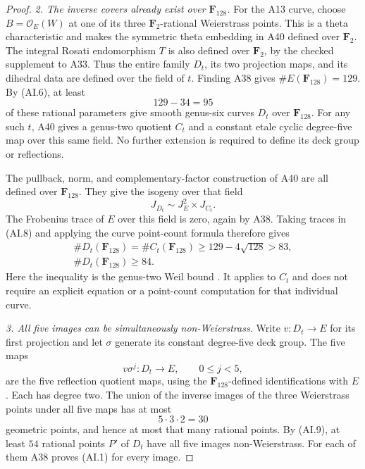 \documentclass[11pt,a4paper]{article}
\begin{document}
\begin{proof}
\emph{2. The inverse covers already exist over $\mathbf F_{128}$.}
For the A13 curve, choose $B=\mathcal O_E(W)$ at one of
its three $\mathbf F_2$-rational Weierstrass points. This
is a theta characteristic and makes the symmetric theta
embedding in A40 defined over $\mathbf F_2$.
The integral Rosati endomorphism $T$ is also defined over
$\mathbf F_2$, by the checked supplement to A33.
Thus the entire family $D_t$, its two projection maps,
and its dihedral data are defined over the field of $t$.
Finding A38 gives $\#E(\mathbf F_{128})=129$.
By (AI.6), at least
\[
                              129-34=95
 \tag{AI.7}
\]
of these rational parameters give smooth genus-six curves
$D_t$ over $\mathbf F_{128}$. For any such $t$, A40 gives
a genus-two quotient $C_t$ and a constant etale cyclic
degree-five map over this same field. No further extension
is required to define its deck group or reflections.

The pullback, norm, and complementary-factor construction
of A40 are all defined over $\mathbf F_{128}$. They give
the isogeny over that field
\[
                      J_{D_t}\sim J_E^2\times J_{C_t}.
 \tag{AI.8}
\]
The Frobenius trace of $E$ over this field is zero, again
by A38. Taking traces in (AI.8) and applying the curve
point-count formula therefore gives
\[
 \begin{gathered}
 \#D_t(\mathbf F_{128})=\#C_t(\mathbf F_{128})
       \ge129-4\sqrt{128}>83,\\
                    \#D_t(\mathbf F_{128})\ge84.
 \end{gathered}
 \tag{AI.9}
\]
Here the inequality is the genus-two Weil bound
\cite[Theorem~11.1]{MilneJV}. It applies to $C_t$ and
does not require an explicit equation or a point-count
computation for that individual curve.

\emph{3. All five images can be simultaneously non-Weierstrass.}
Write $v:D_t\to E$ for its first projection and let
$\sigma$ generate its constant degree-five deck group.
The five maps
\[
                         v\sigma^j:D_t\longrightarrow E,
                              \qquad 0\le j<5,
 \tag{AI.10}
\]
are the five reflection quotient maps, using the
$\mathbf F_{128}$-defined identifications with $E$.
Each has degree two. The union of the inverse images of
the three Weierstrass points under all five maps has at
most
\[
                               5\cdot3\cdot2=30
 \tag{AI.11}
\]
geometric points, and hence at most that many rational
points. By (AI.9), at least $54$ rational points $P'$ of
$D_t$ have all five images non-Weierstrass. For each of
them A38 proves (AI.1) for every image.


\end{proof}
\end{document}
